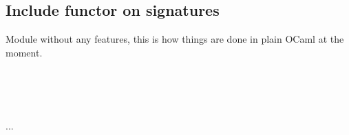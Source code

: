 \subsection{Include functor on signatures\label{Oxcaml--include-functor-on-signatures}}%
\label{Oxcaml--module-No_include_functor}\label{Oxcaml-No_include_functor}\begin{ocamlindent}\label{Oxcaml-No_include_functor--module-Make}\begin{ocamlindent}Module without any  features, this is how things are done in plain OCaml at the moment.\end{ocamlindent}%
\medbreak
\label{Oxcaml-No_include_functor--module-T}\label{Oxcaml-No_include_functor-T}\begin{ocamlindent}\label{Oxcaml-No_include_functor-T--type-t}\\
\end{ocamlindent}%
\\
    \hyperref[Oxcaml-No_include_functor-T]{}\label{Oxcaml-No_include_functor--type-t}\\
  .\allowbreak{}.\allowbreak{}.\allowbreak{} \label{Oxcaml-No_include_functor--type-included}\\
\end{ocamlindent}%
\\
